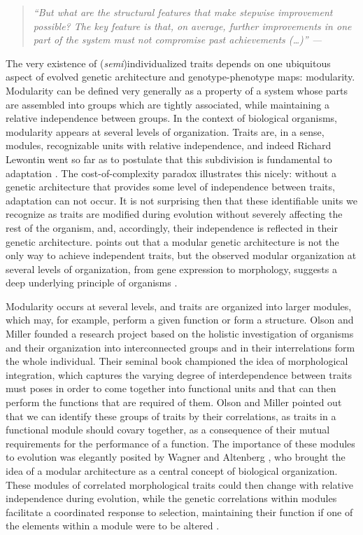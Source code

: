 \begin{refsection}
\begin{quote}
\textit{
``But what are the structural features that make stepwise improvement
possible? The key feature is that, on average, further improvements in
one part of the system must not compromise past achievements (\ldots{})''
--- \textcite{Wagner1996-ui}}
\end{quote}

The very existence of (\emph{semi})individualized traits depends on one
ubiquitous aspect of evolved genetic architecture and genotype-phenotype
maps: modularity. Modularity can
be defined very generally as a property of a system whose parts are
assembled into groups which are tightly associated, while maintaining a
relative independence between groups. In the context of biological
organisms, modularity appears at several levels of organization. Traits
are, in a sense, modules, recognizable units with relative independence,
and indeed Richard Lewontin went so far as to postulate that this
subdivision is fundamental to adaptation \parencite{Lewontin1979-iw}. The
cost-of-complexity paradox illustrates this nicely: without a genetic
architecture that provides some level of independence between traits,
adaptation can not occur. It is not surprising then that these
identifiable units we recognize as traits are modified during evolution
without severely affecting the rest of the organism, and, accordingly,
their independence is reflected in their genetic architecture. 
\textcite{Hansen2003-fh} points out that a modular genetic architecture is
not the only way to achieve independent traits, but the observed modular
organization at several levels of organization, from gene expression to
morphology, suggests a deep underlying principle of organisms
\parencite{Wagner2007-cx}.

Modularity occurs at several levels, and traits are organized into
larger modules, which may, for example, perform a given function or form
a structure. Olson and Miller \parencite*{Olson1958-qk} founded a research
project based on the holistic investigation of organisms and their
organization into interconnected groups and in their interrelations form
the whole individual. Their seminal book championed the idea of
morphological integration, which captures the varying degree of
interdependence between traits must poses in order to come together into
functional units and that can then perform the functions that are
required of them. Olson and Miller pointed out that we can identify
these groups of traits by their correlations, as traits in a functional
module should covary together, as a consequence of their mutual
requirements for the performance of a function. The importance of these
modules to evolution was elegantly posited by Wagner and Altenberg
\parencite*{Wagner1996-ui}, who brought the idea of a modular architecture as
a central concept of biological organization. These modules of
correlated morphological traits could then change with relative
independence during evolution, while the genetic correlations within
modules facilitate a coordinated response to selection, maintaining
their function if one of the elements within a module were to be altered
\parencite{Cheverud1984-mi, Cheverud1982-op}.


\end{refsection}
